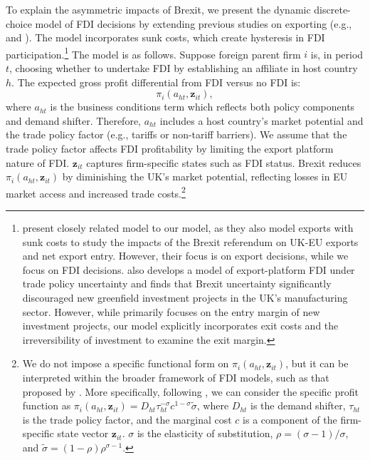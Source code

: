 \documentclass[preprint,11pt,authoryear]{elsarticle}
\begin{document}
To explain the asymmetric impacts of Brexit, we present the dynamic discrete-choice model of FDI decisions by extending previous studies on exporting (e.g., \citealt{graziano2021brexit} and \citealt{roberts1997decision}). The model incorporates sunk costs, which create hysteresis in FDI participation.\footnote{\cite{graziano2021brexit} present closely related model to our model, as they also model exports with sunk costs to study the impacts of the Brexit referendum on UK-EU exports and net export entry. However, their focus is on export decisions, while we focus on FDI decisions. \cite{tamberi2024export} also develops a model of export-platform FDI under trade policy uncertainty and finds that Brexit uncertainty significantly discouraged new greenfield investment projects in the UK's manufacturing sector. However, while \cite{tamberi2024export} primarily focuses on the entry margin of new investment projects, our model explicitly incorporates exit costs and the irreversibility of investment to examine the exit margin.} 
The model is as follows. Suppose foreign parent firm $i$ is, in period $t$, choosing whether to undertake FDI by establishing an affiliate in host country $h$. The expected gross profit differential from FDI versus no FDI is:
$$
\pi_i(a_{ht}, \mathbf{z}_{it}),
$$
where $a_{ht}$ is the business conditions term which reflects both policy components and demand shifter. 
Therefore, $a_{ht}$ includes a host country's market potential and the trade policy factor (e.g., tariffs or non-tariff barriers).
We assume that the trade policy factor affects FDI profitability by limiting the export platform nature of FDI.
$\mathbf{z}_{it}$ captures firm-specific states such as FDI status. Brexit reduces $\pi_i(a_{ht}, \mathbf{z}_{it})$ by diminishing the UK's market potential, reflecting losses in EU market access and increased trade costs.\footnote{We do not impose a specific functional form on $\pi_i(a_{ht}, \mathbf{z}_{it})$, but it can be interpreted within the broader framework of FDI models, such as that proposed by \cite{head2021united}. More specifically, following \cite{graziano2021brexit}, we can consider the specific profit function as $\pi_{i}\left(a_{h t}, \mathbf{z}_{i t}\right)=D_{h t} \tau_{h t}^{-\sigma} c^{1-\sigma} \tilde{\sigma}$, where $D_{h t}$ is the demand shifter, $\tau_{h t}$ is the trade
policy factor, and the marginal cost $c$ is a component of the firm-specific state vector $\mathbf{z}_{i t}$. $\sigma$ is the elasticity of substitution, $\rho=(\sigma-1)/\sigma$, and $\tilde{\sigma}=(1-\rho)\rho^{\sigma-1}$.}
\end{document}
